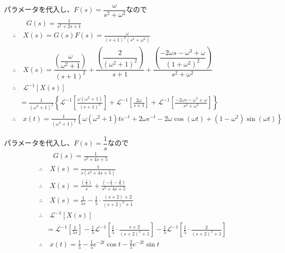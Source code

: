 \documentclass[a4paper,12pt]{article}
\begin{document}
\begin{tcolorbox}[title={2. (7) \(M=1,D=2,K=1,\)入力を\(f(t)=\sin \omega t\)として、応答\(x(t)\)を求めよ。}]
    パラメータを代入し、\(F(s) = \dfrac{\omega}{s^2 + \omega^2}\)なので
    \vspace{-2mm}
    \begin{align*}
        &\qquad G(s) = \frac{1}{s^2 + 2s + 1} \\
        &\therefore \quad X(s) = G(s) F(s) = \frac{\omega}{(s+1)^2(s^2 + \omega^2)} \\
        &\therefore \quad X(s) 
        = \dfrac{\left(\dfrac{\omega}{\omega^2 + 1}\right)}{(s+1)^2}
        + \dfrac{\left(\dfrac{2}{(\omega^2 + 1)^2}\right)}{s+1}
        + \dfrac{\left(\dfrac{-2 \omega s - \omega^3 + \omega}{(1+\omega^2)^2}\right)}{s^2+\omega^2} \\
        &\therefore \quad \mathcal{L}^{-1} \left[ X(s)\right]\\ 
        & \quad = \frac{1}{(\omega^2 + 1)^2} \left\{ \mathcal{L}^{-1} \left[\frac{\omega(\omega^2 + 1)}{(s+1)^2}\right]
        + \mathcal{L}^{-1} \left[\frac{2 \omega }{s+1}\right]
        + \mathcal{L}^{-1} \left[\frac{-2 \omega s-\omega ^3+\omega}{s^2+\omega^2}\right] 
        \right\}\\
        &\therefore \quad x(t) =\frac{1}{(\omega^2 + 1)^2}
        \left\{\omega (\omega^2+1)  t e^{-t}+ 2 \omega e^{-t}
        - 2\omega \cos(\omega t) + (1 - \omega^2)  \sin(\omega t) 
        \right\}
    \end{align*}
\end{tcolorbox}

\begin{tcolorbox}[title={2. (8) \(M=1,D=4,K=5\)としてステップ入力を与えたときの応答\(x(t)\)を求めよ。}]
    パラメータを代入し、\(F(s) = \dfrac{1}{s}\)なので
    \vspace{-2mm}
  \begin{align*}
    &\qquad G(s) = \frac{1}{s^2 + 4s + 5} \\
    &\therefore\quad X(s) = \frac{1}{s(s^2 + 4s + 5)} \\
    &\therefore\quad X(s) = \frac{\left(\frac{1}{5}\right)}{s} 
    + \frac{\left(-\frac{s}{5}-\frac{4}{5}\right)}{s^2 + 4s + 5} \\
    &\therefore\quad X(s) = \frac{1}{5s} - \frac{1}{5} \cdot \frac{(s + 2) + 2}{(s + 2)^2 + 1} \\
    &\therefore \quad \mathcal{L}^{-1} \left[ X(s)\right] \\
    &\quad = \mathcal{L}^{-1} \left[\frac{1}{5s}\right] 
    - \frac{1}{5} \mathcal{L}^{-1} \left[\frac{1}{5} \cdot \frac{s + 2}{(s + 2)^2 + 1}\right]
    - \frac{1}{5} \mathcal{L}^{-1} \left[\frac{1}{5} \cdot \frac{2}{(s + 2)^2 + 1} \right] \\
    &\therefore\quad x(t) = \frac{1}{5} - \frac{1}{5} e^{-2t} \cos t - \frac{2}{5} e^{-2t} \sin t
\end{align*}
\end{tcolorbox}
\end{document}
